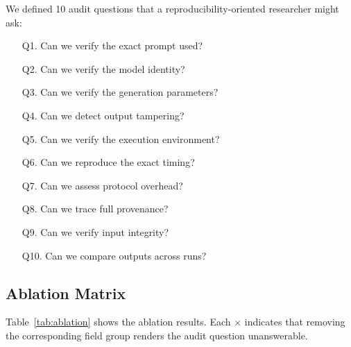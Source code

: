\documentclass[11pt]{article}
\begin{document}
We defined 10 audit questions that a reproducibility-oriented researcher might ask:

\begin{enumerate}[noitemsep]
    \item[Q1.] Can we verify the exact prompt used?
    \item[Q2.] Can we verify the model identity?
    \item[Q3.] Can we verify the generation parameters?
    \item[Q4.] Can we detect output tampering?
    \item[Q5.] Can we verify the execution environment?
    \item[Q6.] Can we reproduce the exact timing?
    \item[Q7.] Can we assess protocol overhead?
    \item[Q8.] Can we trace full provenance?
    \item[Q9.] Can we verify input integrity?
    \item[Q10.] Can we compare outputs across runs?
\end{enumerate}

\subsection{Ablation Matrix}

Table~\ref{tab:ablation} shows the ablation results. Each $\times$ indicates that removing the corresponding field group renders the audit question unanswerable.
\end{document}
